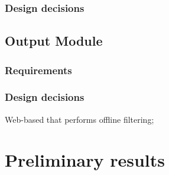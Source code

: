 \documentclass{llncs}
\begin{document}
\subsubsection{Design decisions}

\subsection{Output Module}
\subsubsection{Requirements}
\subsubsection{Design decisions}






Web-based that performs offline filtering;




\section{Preliminary results}
\end{document}
